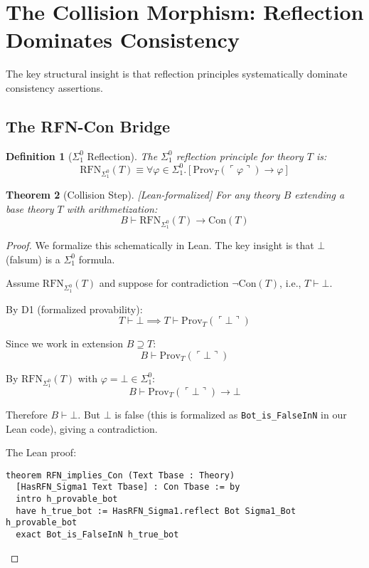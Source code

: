 \documentclass[11pt]{article}
\newtheorem{theorem}{Theorem}[section]
\newtheorem{definition}[theorem]{Definition}
\newcommand{\Con}{\mathrm{Con}}
\newcommand{\RFNSigOne}{\mathrm{RFN}_{\Sigma^0_1}}
\newcommand{\Prov}{\mathrm{Prov}}
\newcommand{\leanok}{\textsf{\textcolor{green!70!black}{[Lean-formalized]}}}
\begin{document}
\section{The Collision Morphism: Reflection Dominates Consistency}

The key structural insight is that reflection principles systematically dominate consistency assertions.

\subsection{The RFN-Con Bridge}

\begin{definition}[$\Sigma^0_1$ Reflection]
The $\Sigma^0_1$ reflection principle for theory $T$ is:
$$\RFNSigOne(T) \equiv \forall \varphi \in \Sigma^0_1. [\Prov_T(\ulcorner\varphi\urcorner) \to \varphi]$$
\end{definition}

\begin{theorem}[Collision Step] \leanok
For any theory $B$ extending a base theory $T$ with arithmetization:
$$B \vdash \RFNSigOne(T) \to \Con(T)$$
\end{theorem}

\begin{proof}
We formalize this schematically in Lean. The key insight is that $\bot$ (falsum) is a $\Sigma^0_1$ formula.

Assume $\RFNSigOne(T)$ and suppose for contradiction $\neg\Con(T)$, i.e., $T \vdash \bot$.

By D1 (formalized provability):
$$T \vdash \bot \implies T \vdash \Prov_T(\ulcorner\bot\urcorner)$$

Since we work in extension $B \supseteq T$:
$$B \vdash \Prov_T(\ulcorner\bot\urcorner)$$

By $\RFNSigOne(T)$ with $\varphi = \bot \in \Sigma^0_1$:
$$B \vdash \Prov_T(\ulcorner\bot\urcorner) \to \bot$$

Therefore $B \vdash \bot$. But $\bot$ is false (this is formalized as \texttt{Bot\_is\_FalseInN} in our Lean code), giving a contradiction.

The Lean proof:
\begin{lstlisting}[language=Lean]
theorem RFN_implies_Con (Text Tbase : Theory) 
  [HasRFN_Sigma1 Text Tbase] : Con Tbase := by
  intro h_provable_bot
  have h_true_bot := HasRFN_Sigma1.reflect Bot Sigma1_Bot h_provable_bot
  exact Bot_is_FalseInN h_true_bot
\end{lstlisting}
\end{proof}
\end{document}
